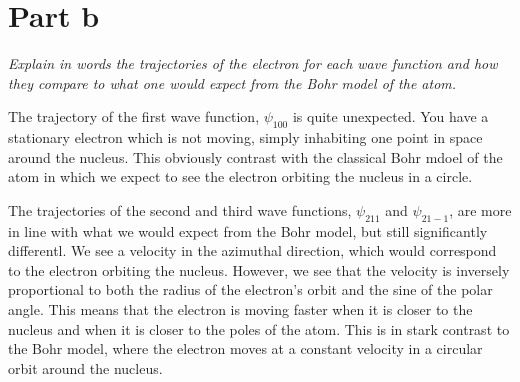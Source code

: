 \documentclass[11pt, a4paper]{article}
\begin{document}
\section{Part b} \emph{Explain in words the trajectories of the electron for
each wave function and how they compare to what one would expect from the Bohr
model of the atom.}

The trajectory of the first wave function, $\psi_{100}$ is quite unexpected. You
have a stationary electron which is not moving, simply inhabiting one point in 
space around the nucleus. This obviously contrast with the classical Bohr mdoel
of the atom in which we expect to see the electron orbiting the nucleus in a
circle.

The trajectories of the second and third wave functions, $\psi_{211}$ and
$\psi_{21-1}$, are more in line with what we would expect from the Bohr model,
but still significantly differentl. We see a velocity in the azimuthal direction,
which would correspond to the electron orbiting the nucleus. However, we see
that the velocity is inversely proportional to both the radius of the electron's
orbit and the sine of the polar angle. This means that the electron is moving
faster when it is closer to the nucleus and when it is closer to the poles of
the atom. This is in stark contrast to the Bohr model, where the electron moves
at a constant velocity in a circular orbit around the nucleus.
\end{document}
